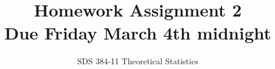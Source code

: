 \documentclass[11pt]{article}
\begin{document}
\title{{\bf Homework Assignment 2}\\Due Friday March 4th midnight}
\author{SDS 384-11 Theoretical Statistics}

\date{}

\maketitle{}
\begin{enumerate}%



\end{enumerate}
\end{document}
